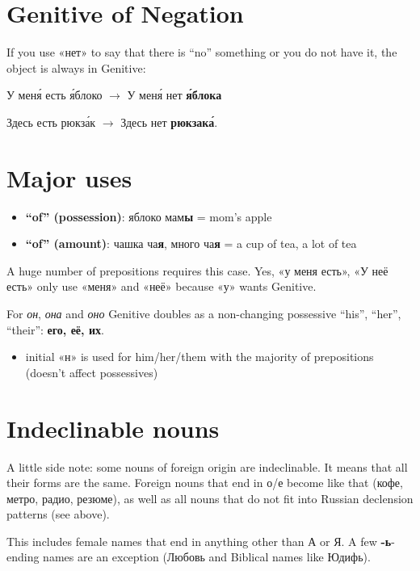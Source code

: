 \section{Genitive of Negation}\label{genitive-of-negation}

If you use «нет» to say that there is ``no'' something or you do not
have it, the object is always in Genitive:

У мен\'{я} есть \'{я}блоко $ \rightarrow$ У мен\'{я} нет \textbf{\'{я}блока}

Здесь есть рюкз\'{а}к $ \rightarrow$ Здесь нет \textbf{рюкзак\'{а}}.

\section{Major uses}\label{major-uses}

\begin{itemize}
\tightlist
\item
  \textbf{``of'' (possession)}: яблоко мам\textbf{ы} = mom's apple
\item
  \textbf{``of'' (amount)}: чашка ча\textbf{я}, много ча\textbf{я} = a
  cup of tea, a lot of tea
\end{itemize}

A huge number of prepositions requires this case. Yes, «у меня есть», «У
неё есть» only use «меня» and «неё» because «у» wants Genitive.

For \emph{он}, \emph{она} and \emph{оно} Genitive doubles as a
non-changing possessive ``his'', ``her'', ``their'': \textbf{его, её,
их}.

\begin{itemize}
\tightlist
\item
  initial «н» is used for him/her/them with the majority of prepositions
  (doesn't affect possessives)\\
\end{itemize}

\section{Indeclinable nouns}\label{indeclinable-nouns}

A little side note: some nouns of foreign origin are indeclinable. It
means that all their forms are the same. Foreign nouns that end in о/е
become like that (кофе, метро, радио, резюме), as well as all nouns that
do not fit into Russian declension patterns (see above).

This includes female names that end in anything other than А or Я. A few
\textbf{-ь}-ending names are an exception (Любовь and Biblical names
like Юдифь).

